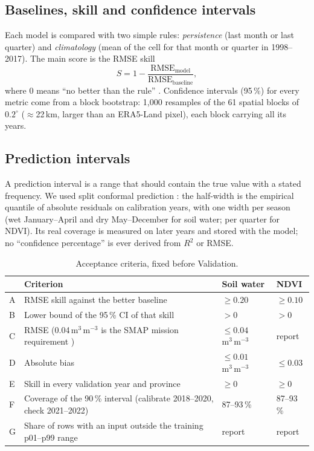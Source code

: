 \documentclass[11pt,a4paper]{article}
\newcommand{\sm}{\ensuremath{\mathrm{m^3\,m^{-3}}}}
\begin{document}
\subsection{Baselines, skill and confidence intervals}
Each model is compared with two simple rules: \emph{persistence} (last month or last quarter) and \emph{climatology}
(mean of the cell for that month or quarter in 1998--2017). The main score is the RMSE skill
\begin{equation}
S = 1 - \frac{\mathrm{RMSE}_\text{model}}{\mathrm{RMSE}_\text{baseline}},
\end{equation}
where 0 means ``no better than the rule'' \citep{murphy1988}. Confidence intervals (95\,\%) for every metric come from a
block bootstrap: 1,000 resamples of the 61 spatial blocks of $0.2^\circ$ ($\approx$22\,km, larger than an ERA5-Land pixel),
each block carrying all its years.

\subsection{Prediction intervals}
A prediction interval is a range that should contain the true value with a stated frequency. We used split conformal
prediction \citep{angelopoulos2021}: the half-width is the empirical quantile of absolute residuals on calibration years,
with one width per season (wet January--April and dry May--December for soil water; per quarter for NDVI). Its real coverage is
measured on later years and stored with the model; no ``confidence percentage'' is ever derived from $R^2$ or RMSE.

\begin{table}[H]
\centering\small
\caption{Acceptance criteria, fixed before Validation.}
\label{tab:criteria}
\begin{tabularx}{\textwidth}{lXll}
\toprule
& Criterion & Soil water & NDVI \\
\midrule
A & RMSE skill against the better baseline & $\ge 0.20$ & $\ge 0.10$ \\
B & Lower bound of the 95\,\% CI of that skill & $>0$ & $>0$ \\
C & RMSE (0.04\,\sm{} is the SMAP mission requirement \citep{entekhabi2010}) & $\le 0.04$\,\sm & report \\
D & Absolute bias & $\le 0.01$\,\sm & $\le 0.03$ \\
E & Skill in every validation year and province & $\ge 0$ & $\ge 0$ \\
F & Coverage of the 90\,\% interval (calibrate 2018--2020, check 2021--2022) & 87--93\,\% & 87--93\,\% \\
G & Share of rows with an input outside the training p01--p99 range & report & report \\
\bottomrule
\end{tabularx}
\end{table}
\end{document}
